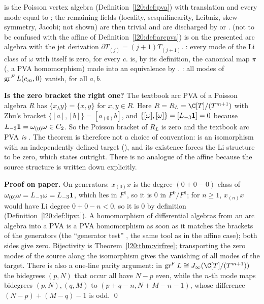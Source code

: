 \begin{dictionary}
 is the Poisson vertex algebra (Definition~\ref{l20:def:pva}) with translation  and every mode equal to
; the remaining fields (locality, sesquilinearity, Leibniz, skew-symmetry, Jacobi; not shown) are then trivial and are
discharged by  or .  (not to be confused with the affine
 of Definition~\ref{l20:def:arcpva}) is  on the presented arc algebra with the jet derivation
$\partial T_{(j)}=(j+1)T_{(j+1)}$. : every mode of the Li class of $\omega$ with itself is zero, for every $c$.
 is, by its definition, the canonical map $\pi$ (, a PVA homomorphism) made into an
equivalence by . : all modes of $\operatorname{gr}^F L(c_m,0)$ vanish, for all
$a,b$.

\textbf{Is the zero bracket the right one?} The textbook arc PVA of a Poisson algebra $R$ has $\{x_\lambda y\}=\{x,y\}$ for
$x,y\in R$. Here $R=R_L=\C[T]/(T^{m+1})$ with Zhu's bracket $\{[a],[b]\}=[a_{(0)}b]$, and $\{[\omega],[\omega]\}=[L_{-3}\mathbf{1}]=0$
because $L_{-3}\mathbf{1}=\omega_{(0)}\omega\in C_2$. So the Poisson bracket of $R_L$ is zero and the textbook arc PVA \emph{is}
. The theorem is therefore not a choice of convention:  is an isomorphism with an independently
defined target (), and its existence forces the Li structure to be zero, which
 states outright. There is no analogue of the affine  because the source
structure is written down explicitly.
\end{dictionary}

\textbf{Proof on paper.} On generators: $x_{(0)}x$ is the degree-$(0+0-0)$ class of $\omega_{(0)}\omega=L_{-1}\omega=L_{-3}\mathbf{1}$,
which lies in $F^1$, so it is $0$ in $F^0/F^1$; for $n\ge1$, $x_{(n)}x$ would have Li degree $0+0-n<0$, so it is $0$ by definition
(Definition~\ref{l20:def:lipva}). A homomorphism of differential algebras from an arc algebra into a PVA is a PVA homomorphism as
soon as it matches the brackets of the generators (the ``generator test'' , the same tool as in
the affine case); both sides give zero. Bijectivity is Theorem~\ref{l20:thm:virfree}; transporting the zero modes of the source
along the isomorphism gives the vanishing of all modes of the target. There is also a one-line parity argument: in
$\ltwentygr L\cong\ltwentyJ(\C[T]/(T^{m+1}))$ the bidegrees $(p,N)$ that occur all have $N-p$ even, while the $n$-th mode maps
bidegrees $(p,N),(q,M)$ to $(p+q-n,N+M-n-1)$, whose difference $(N-p)+(M-q)-1$ is odd. \qed

